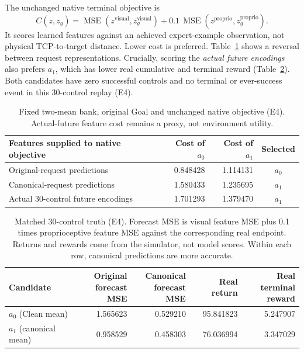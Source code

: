 \documentclass[11pt]{article}
\newcommand{\mse}{\operatorname{MSE}}
\begin{document}
The unchanged native terminal objective is
\begin{equation}
 C(z,z_g)=\mse(z^{\mathrm{visual}},z_g^{\mathrm{visual}})
       +0.1\,\mse(z^{\mathrm{proprio}},z_g^{\mathrm{proprio}}).
\end{equation}
It scores learned features against an achieved expert-example observation,
not physical TCP-to-target distance. Lower cost is preferred. Table~\ref{tab:cost}
shows a reversal between request representations. Crucially, scoring the
\emph{actual future encodings} also prefers $a_1$, which has lower real
cumulative and terminal reward (Table~\ref{tab:truth}). Both candidates have
zero successful controls and no terminal or ever-success event in this
30-control replay (E4).

\begin{table}[t]
\centering
\begin{tabular}{lrrc}
\toprule
Features supplied to native objective & Cost of $a_0$ & Cost of $a_1$ & Selected\\
\midrule
Original-request predictions & 0.848428 & 1.114131 & $a_0$\\
Canonical-request predictions & 1.580433 & 1.235695 & $a_1$\\
Actual 30-control future encodings & 1.701293 & 1.379470 & $a_1$\\
\bottomrule
\end{tabular}
\caption{Fixed two-mean bank, original Goal and unchanged native objective
(E4). Actual-future feature cost remains a proxy, not environment utility.}
\label{tab:cost}
\end{table}

\begin{table}[t]
\centering
\small
\begin{tabular}{lrrrr}
\toprule
Candidate & \shortstack{Original\\forecast MSE} & \shortstack{Canonical\\forecast MSE} & Real return & \shortstack{Real terminal\\reward}\\
\midrule
$a_0$ (Clean mean) & 1.565623 & 0.529210 & 95.841823 & 5.247907\\
$a_1$ (canonical mean) & 0.958529 & 0.458303 & 76.036994 & 3.347029\\
\bottomrule
\end{tabular}
\caption{Matched 30-control truth (E4). Forecast MSE is visual feature MSE
plus 0.1 times proprioceptive feature MSE against the corresponding real
endpoint. Returns and rewards come from the simulator, not model scores.
Within each row, canonical predictions are more accurate.}
\label{tab:truth}
\end{table}
\end{document}
